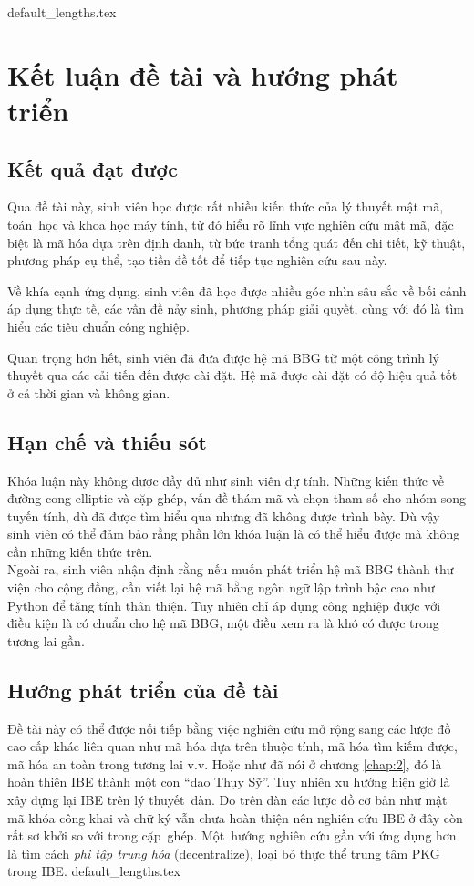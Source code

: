 \documentclass[class=report, crop=false]{standalone}
\begin{document}
	{default_lengths.tex}
	\chapter{Kết luận đề tài và hướng phát triển}\label{chap:7}
	\section{Kết quả đạt được}
		Qua đề tài này, sinh viên học được rất nhiều kiến thức của lý thuyết mật mã, toán~học và khoa học máy tính, từ đó hiểu rõ lĩnh vực nghiên cứu mật mã, đặc biệt là mã hóa dựa trên định danh, từ bức tranh tổng quát đến chi tiết, kỹ thuật, phương pháp cụ thể, tạo tiền đề tốt để tiếp tục nghiên cứu sau này.

		Về khía cạnh ứng dụng, sinh viên đã học được nhiều góc nhìn sâu sắc về bối cảnh áp dụng thực tế, các vấn đề nảy sinh, phương pháp giải quyết, cùng với đó là tìm hiểu các tiêu chuẩn công nghiệp.
		
		Quan trọng hơn hết, sinh viên đã đưa được hệ mã BBG từ một công trình lý thuyết qua các cải tiến đến được cài đặt. Hệ mã được cài đặt có độ hiệu quả tốt ở cả thời gian và không gian.
	\section{Hạn chế và thiếu sót}
		Khóa luận này không được đầy đủ như sinh viên dự tính. Những kiến thức về đường cong elliptic và cặp ghép, vấn đề thám mã và chọn tham số cho nhóm song tuyến tính, dù đã được tìm hiểu qua nhưng đã không được trình bày. Dù vậy sinh viên có thể đảm bảo rằng phần lớn khóa luận là có thể hiểu được mà không cần những kiến thức trên. \\

		Ngoài ra, sinh viên nhận định rằng nếu muốn phát triển hệ mã BBG thành thư viện cho cộng đồng, cần viết lại hệ mã bằng ngôn ngữ lập trình bậc cao như Python để tăng tính thân thiện. Tuy nhiên chỉ áp dụng công nghiệp được với điều kiện là có chuẩn cho hệ mã BBG, một điều xem ra là khó có được trong tương lai gần.
	\section{Hướng phát triển của đề tài}
		Đề tài này có thể được nối tiếp bằng việc nghiên cứu mở rộng sang các lược đồ cao cấp khác liên quan như mã hóa dựa trên thuộc tính, mã hóa tìm kiếm được, mã hóa an toàn trong tương lai v.v. Hoặc như đã nói ở chương \ref{chap:2}, đó là hoàn thiện IBE thành một con ``dao Thụy Sỹ''. Tuy nhiên xu hướng hiện giờ là xây dựng lại IBE trên lý thuyết~dàn. Do trên dàn các lược đồ cơ bản như mật mã khóa công khai và chữ ký vẫn chưa hoàn thiện nên nghiên cứu IBE ở đây còn rất sơ khởi so với trong cặp~ghép. Một~hướng nghiên cứu gần với ứng dụng hơn là tìm cách \emph{phi tập trung hóa} (decentralize), loại bỏ thực thể trung tâm PKG trong IBE.
	\newpage
	{default_lengths.tex}
\end{document}
